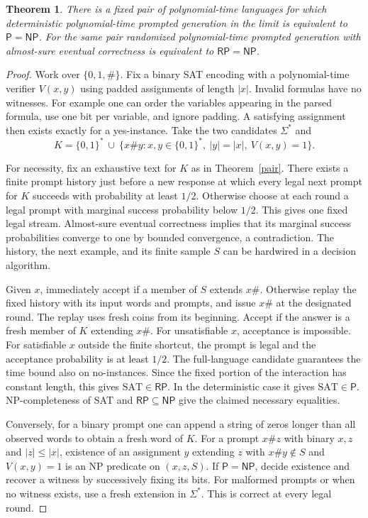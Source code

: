 \documentclass[11pt]{article}
\newtheorem{theorem}{Theorem}
\newcommand{\Full}{\Sigma^*}
\newcommand{\NP}{\mathsf{NP}}
\newcommand{\RP}{\mathsf{RP}}
\newcommand{\PT}{\mathsf P}
\begin{document}
\begin{theorem}\label{sat}
There is a fixed pair of polynomial-time languages for which deterministic polynomial-time prompted generation in the limit is equivalent to $\PT=\NP$. For the same pair randomized polynomial-time prompted generation with almost-sure eventual correctness is equivalent to $\RP=\NP$.
\end{theorem}
\begin{proof}
Work over $\{0,1,\#\}$. Fix a binary SAT encoding with a polynomial-time verifier $V(x,y)$ using padded assignments of length $|x|$. Invalid formulas have no witnesses. For example one can order the variables appearing in the parsed formula, use one bit per variable, and ignore padding. A satisfying assignment then exists exactly for a yes-instance. Take the two candidates $\Full$ and
\[
 K=\{0,1\}^* \ \cup\
 \{x\#y:x,y\in\{0,1\}^*,\ |y|=|x|,\ V(x,y)=1\}.
\]

For necessity, fix an exhaustive text for $K$ as in Theorem~\ref{pair}. There exists a finite prompt history just before a new response at which every legal next prompt for $K$ succeeds with probability at least $1/2$. Otherwise choose at each round a legal prompt with marginal success probability below $1/2$. This gives one fixed legal stream. Almost-sure eventual correctness implies that its marginal success probabilities converge to one by bounded convergence, a contradiction. The history, the next example, and its finite sample $S$ can be hardwired in a decision algorithm.

Given $x$, immediately accept if a member of $S$ extends $x\#$. Otherwise replay the fixed history with its input words and prompts, and issue $x\#$ at the designated round. The replay uses fresh coins from its beginning. Accept if the answer is a fresh member of $K$ extending $x\#$. For unsatisfiable $x$, acceptance is impossible. For satisfiable $x$ outside the finite shortcut, the prompt is legal and the acceptance probability is at least $1/2$. The full-language candidate guarantees the time bound also on no-instances. Since the fixed portion of the interaction has constant length, this gives $\mathrm{SAT}\in\RP$. In the deterministic case it gives $\mathrm{SAT}\in\PT$. NP-completeness of SAT and $\RP\subseteq\NP$ give the claimed necessary equalities.

Conversely, for a binary prompt one can append a string of zeros longer than all observed words to obtain a fresh word of $K$. For a prompt $x\#z$ with binary $x,z$ and $|z|\le |x|$, existence of an assignment $y$ extending $z$ with $x\#y\notin S$ and $V(x,y)=1$ is an NP predicate on $(x,z,S)$. If $\PT=\NP$, decide existence and recover a witness by successively fixing its bits. For malformed prompts or when no witness exists, use a fresh extension in $\Full$. This is correct at every legal round.


\end{proof}
\end{document}
